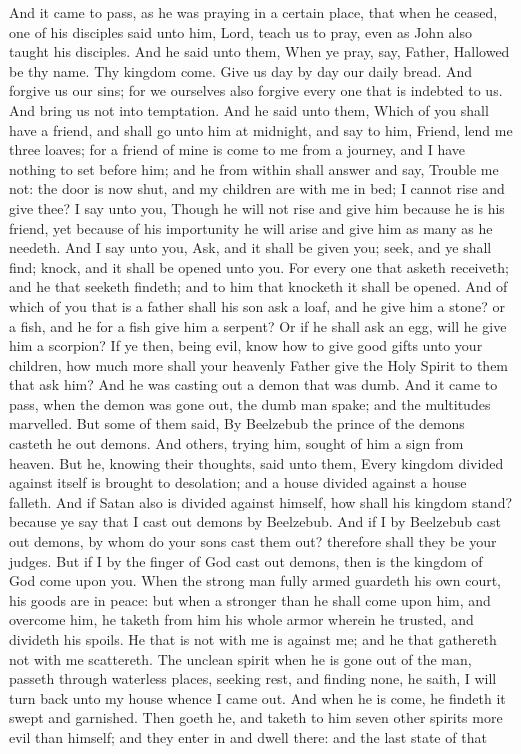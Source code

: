 And it came to pass, as he was praying in a certain place, that when he ceased, one of his disciples said unto him, Lord, teach us to pray, even as John also taught his disciples. And he said unto them, When ye pray, say, Father, Hallowed be thy name. Thy kingdom come. Give us day by day our daily bread. And forgive us our sins; for we ourselves also forgive every one that is indebted to us. And bring us not into temptation.  And he said unto them, Which of you shall have a friend, and shall go unto him at midnight, and say to him, Friend, lend me three loaves; for a friend of mine is come to me from a journey, and I have nothing to set before him; and he from within shall answer and say, Trouble me not: the door is now shut, and my children are with me in bed; I cannot rise and give thee? I say unto you, Though he will not rise and give him because he is his friend, yet because of his importunity he will arise and give him as many as he needeth. And I say unto you, Ask, and it shall be given you; seek, and ye shall find; knock, and it shall be opened unto you. For every one that asketh receiveth; and he that seeketh findeth; and to him that knocketh it shall be opened. And of which of you that is a father shall his son ask a loaf, and he give him a stone? or a fish, and he for a fish give him a serpent? Or if he shall ask an egg, will he give him a scorpion? If ye then, being evil, know how to give good gifts unto your children, how much more shall your heavenly Father give the Holy Spirit to them that ask him?  And he was casting out a demon that was dumb. And it came to pass, when the demon was gone out, the dumb man spake; and the multitudes marvelled. But some of them said, By Beelzebub the prince of the demons casteth he out demons. And others, trying him, sought of him a sign from heaven. But he, knowing their thoughts, said unto them, Every kingdom divided against itself is brought to desolation; and a house divided against a house falleth. And if Satan also is divided against himself, how shall his kingdom stand? because ye say that I cast out demons by Beelzebub. And if I by Beelzebub cast out demons, by whom do your sons cast them out? therefore shall they be your judges. But if I by the finger of God cast out demons, then is the kingdom of God come upon you. When the strong man fully armed guardeth his own court, his goods are in peace: but when a stronger than he shall come upon him, and overcome him, he taketh from him his whole armor wherein he trusted, and divideth his spoils. He that is not with me is against me; and he that gathereth not with me scattereth. The unclean spirit when he is gone out of the man, passeth through waterless places, seeking rest, and finding none, he saith, I will turn back unto my house whence I came out. And when he is come, he findeth it swept and garnished. Then goeth he, and taketh to him seven other spirits more evil than himself; and they enter in and dwell there: and the last state of that 